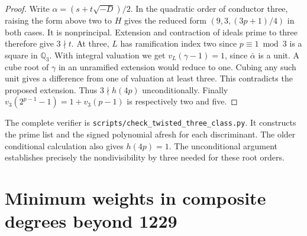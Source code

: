 \documentclass[11pt]{article}
\begin{document}
\begin{proof}
Write \(\alpha=(s+t\sqrt{-D})/2\). In the quadratic order of
conductor three, raising the form above two to \(H\) gives the
reduced form \((9,3,(3p+1)/4)\) in both cases. It is nonprincipal.
Extension and contraction of ideals prime to three therefore give
\(3\nmid t\). At three, \(L\) has ramification index two since
\(p\equiv1\bmod3\) is a square in \(\mathbb Q_3\). With integral
valuation we get \(v_L(\gamma-1)=1\), since \(\bar\alpha\) is a
unit. A cube root of \(\gamma\) in an unramified extension would
reduce to one. Cubing any such unit gives a difference from one of
valuation at least three. This contradicts the proposed extension.
Thus \(3\nmid h(4p)\) unconditionally. Finally
\(v_3(2^{p-1}-1)=1+v_3(p-1)\) is respectively two and five.
\end{proof}

The complete verifier is \nolinkurl{scripts/check_twisted_three_class.py}.
It constructs the prime list and the signed polynomial afresh for
each discriminant. The older conditional calculation also gives
\(h(4p)=1\). The unconditional argument establishes precisely the
nondivisibility by three needed for these root orders.

\clearpage
\section{Minimum weights in composite degrees beyond 1229}
\label{sec:composite-order-witnesses}
\end{document}
